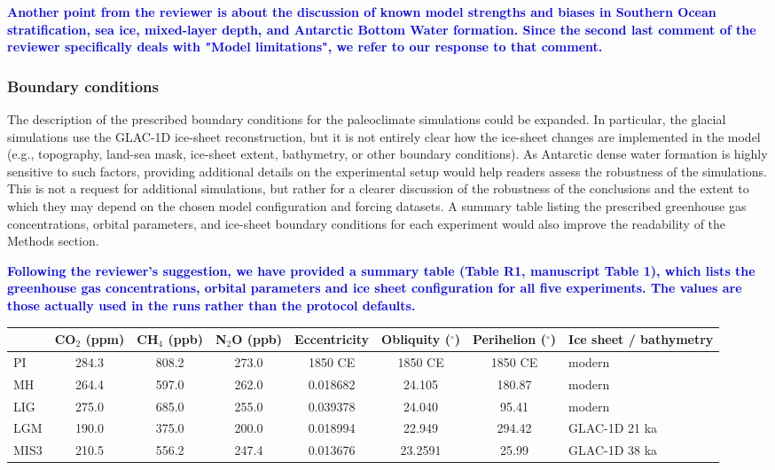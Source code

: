 \documentclass[pdflatex,sn-nature]{sn-jnl}
\begin{document}
\noindent\textcolor{blue}{\textbf{Another point from the reviewer is about the discussion of known model strengths and biases in Southern Ocean stratification, sea ice, mixed-layer depth, and Antarctic Bottom Water formation. Since the second last comment of the reviewer specifically deals with "Model limitations", we refer to our response to that comment.}}


\subsubsection*{Boundary conditions}

\medskip
\noindent The description of the prescribed boundary conditions for the paleoclimate simulations could be expanded. In particular, the glacial simulations use the GLAC-1D ice-sheet reconstruction, but it is not entirely clear how the ice-sheet changes are implemented in the model (e.g., topography, land-sea mask, ice-sheet extent, bathymetry, or other boundary conditions). As Antarctic dense water formation is highly sensitive to such factors, providing additional details on the experimental setup would help readers assess the robustness of the simulations. This is not a request for additional simulations, but rather for a clearer discussion of the robustness of the conclusions and the extent to which they may depend on the chosen model configuration and forcing datasets. A summary table listing the prescribed greenhouse gas concentrations, orbital parameters, and ice-sheet boundary conditions for each experiment would also improve the readability of the Methods section.
\medskip

\noindent\textcolor{blue}{\textbf{Following the reviewer's suggestion, we have provided a summary table (Table R1, manuscript Table 1), which lists the greenhouse gas concentrations, orbital parameters and ice sheet configuration for all five experiments. The values are those actually used in the runs rather than the protocol defaults.}}


\medskip
\noindent\begin{center}\footnotesize
\begin{tabular}{lccccccp{2.0cm}}
\hline
 & CO$_2$ (ppm) & CH$_4$ (ppb) & N$_2$O (ppb) & Eccentricity & Obliquity ($^\circ$) & Perihelion ($^\circ$) & Ice sheet / bathymetry \\
\hline
PI & 284.3 & 808.2 & 273.0 & 1850 CE & 1850 CE & 1850 CE & modern \\
MH & 264.4 & 597.0 & 262.0 & 0.018682 & 24.105 & 180.87 & modern \\
LIG & 275.0 & 685.0 & 255.0 & 0.039378 & 24.040 & 95.41 & modern \\
LGM & 190.0 & 375.0 & 200.0 & 0.018994 & 22.949 & 294.42 & GLAC-1D 21 ka \\
MIS3 & 210.5 & 556.2 & 247.4 & 0.013676 & 23.2591 & 25.99 & GLAC-1D 38 ka \\
\hline
\end{tabular}\end{center}
\medskip
\end{document}
